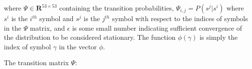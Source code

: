 \documentclass[12pt]{article}
\begin{document}
\begin{enumerate}
where $\Psi \in \mathbf{R}^{53\times53}$ containing the transition probabilities, $\Psi_{i, j} = P(s^j | s^i)$ where $s^i$ is the $i^{th}$ symbol and $s^j$ is the $j^{th}$ symbol with respect to the indices of symbols in the $\Psi$ matrix, and $\epsilon$ is some small number indicating sufficient convergence of the distribution to be considered stationary. The function $\phi(\gamma)$ is simply the index of symbol $\gamma$ in the vector $\phi$.

%
%
%
%
%
%



The transition matrix $\Psi$:



\end{enumerate}
\end{document}
